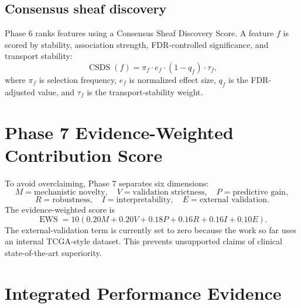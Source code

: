 \documentclass[11pt]{article}
\begin{document}
\subsection{Consensus sheaf discovery}
Phase 6 ranks features using a Consensus Sheaf Discovery Score. A feature $f$ is scored by stability, association strength, FDR-controlled significance, and transport stability:
\[
    \operatorname{CSDS}(f)=
    \pi_f\cdot e_f\cdot (1-q_f)\cdot \tau_f,
\]
where $\pi_f$ is selection frequency, $e_f$ is normalized effect size, $q_f$ is the FDR-adjusted value, and $\tau_f$ is the transport-stability weight.

\section{Phase 7 Evidence-Weighted Contribution Score}
To avoid overclaiming, Phase 7 separates six dimensions:
\[
M=\text{mechanistic novelty},\quad
V=\text{validation strictness},\quad
P=\text{predictive gain},
\]
\[
R=\text{robustness},\quad
I=\text{interpretability},\quad
E=\text{external validation}.
\]
The evidence-weighted score is
\[
\operatorname{EWS}=10(0.20M+0.20V+0.18P+0.16R+0.16I+0.10E).
\]
The external-validation term is currently set to zero because the work so far uses an internal TCGA-style dataset. This prevents unsupported claims of clinical state-of-the-art superiority.

\section{Integrated Performance Evidence}
\end{document}
